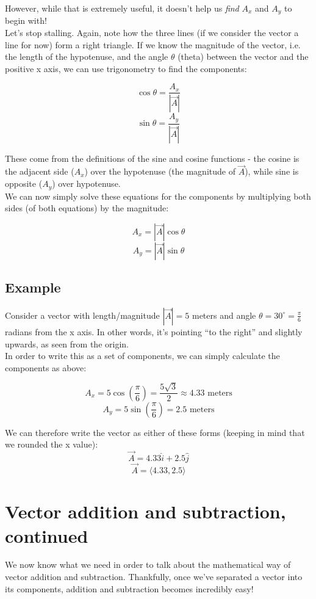 \documentclass[12pt,a4paper]{report}
\begin{document}
However, while that is extremely useful, it doesn't help us \emph{find} $A_x$ and $A_y$ to begin with!\\
Let's stop stalling. Again, note how the three lines (if we consider the vector a line for now) form a right triangle. If we know the magnitude of the vector, i.e. the length of the hypotenuse, and the angle $\theta$ (theta) between the vector and the positive x axis, we can use trigonometry to find the components:

\[ \cos{\theta} = \frac{A_x}{|\vec{A}|} \]
\[ \sin{\theta} = \frac{A_y}{|\vec{A}|} \]

These come from the definitions of the sine and cosine functions - the cosine is the adjacent side ($A_x$) over the hypotenuse (the magnitude of $\vec{A}$), while sine is opposite ($A_y$) over hypotenuse.\\
We can now simply solve these equations for the components by multiplying both sides (of both equations) by the magnitude:

\[ A_x = |\vec{A}| \cos{\theta} \]
\[ A_y = |\vec{A}| \sin{\theta} \]

\subsection{Example}
Consider a vector with length/magnitude $|\vec{A}| = 5$ meters and angle $\displaystyle \theta = 30^{\circ} = \frac{\pi}{6}$ radians from the x axis. In other words, it's pointing ``to the right'' and slightly upwards, as seen from the origin.\\
In order to write this as a set of components, we can simply calculate the components as above:

\[ A_x = 5 \cos{\left( \frac{\pi}{6}\right) } = \frac{5 \sqrt{3}}{2} \approx 4.33 \text { meters} \]
\[ A_y = 5 \sin{\left( \frac{\pi}{6}\right) } = 2.5 \text { meters} \]

We can therefore write the vector as either of these forms (keeping in mind that we rounded the x value):
\[ \vec{A} = 4.33 \hat{i} + 2.5 \hat{j} \]
\[ \vec{A} = \langle 4.33, 2.5 \rangle \]

\section{Vector addition and subtraction, continued}
We now know what we need in order to talk about the mathematical way of vector addition and subtraction. Thankfully, once we've separated a vector into its components, addition and subtraction becomes incredibly easy!
\end{document}

